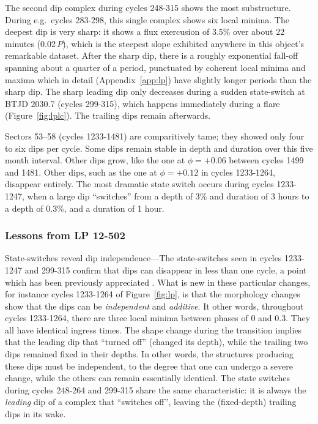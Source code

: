 \documentclass[11pt,twocolumn,tighten]{aastex63}
\begin{document}
The second dip complex during cycles 248-315 shows the most
substructure.  During e.g.~cycles 283-298, this single complex shows
six local minima.  The deepest dip is very sharp: it shows a flux
exercusion of 3.5\% over about 22 minutes (0.02\,$P$), which is the
steepest slope exhibited anywhere in this object's remarkable dataset.
After the sharp dip, there is a roughly exponential fall-off spanning
about a quarter of a period, punctuated by coherent local minima and
maxima which in detail (Appendix~\ref{app:lp}) have slightly
longer periods than the sharp dip.  The sharp leading dip only
decreases during a sudden state-switch at BTJD 2030.7 (cycles
299-315), which happens immediately during a flare
(Figure~\ref{fig:lplc}).  The trailing dips remain afterwards.

Sectors 53--58 (cycles 1233-1481) are comparitively tame; they showed
only four to six dips per cycle.  Some dips remain stable in depth and
duration over this five month interval.  Other dips grow, like the one
at $\phi = +0.06$ between cycles 1499 and 1481.  Other dips, such as
the one at $\phi = +0.12$ in cycles 1233-1264, disappear entirely.
The most dramatic state switch occurs during cycles 1233-1247, when a
large dip ``switches'' from a depth of 3\% and duration of 3 hours to
a depth of 0.3\%, and a duration of 1 hour.


\subsubsection{Lessons from LP 12-502}

{\sc State-switches reveal dip independence}---The state-switches seen
in cycles 1233-1247 and 299-315 confirm that dips can disappear in
less than one cycle, a point which has been previously appreciated
\citep{2017AJ....153..152S}.  What is new in these particular changes,
for instance cycles 1233-1264 of Figure~\ref{fig:lp}, is that the
morphology changes show that the dips can be {\it independent} and
{\it additive}.  It other words, throughout cycles 1233-1264, there
are three local minima between phases of 0 and 0.3.  They all have
identical ingress times.  The shape change during the transition
implies that the leading dip that ``turned off'' (changed its depth),
while the trailing two dips remained fixed in their depths.  In other
words, the structures producing these dips must be independent, to the
degree that one can undergo a severe change, while the others can
remain essentially identical.  The state switches during cycles
248-264 and 299-315 share the same characteristic: it is always the
{\it leading} dip of a complex that ``switches off'', leaving the
(fixed-depth) trailing dips in its wake.
\end{document}
